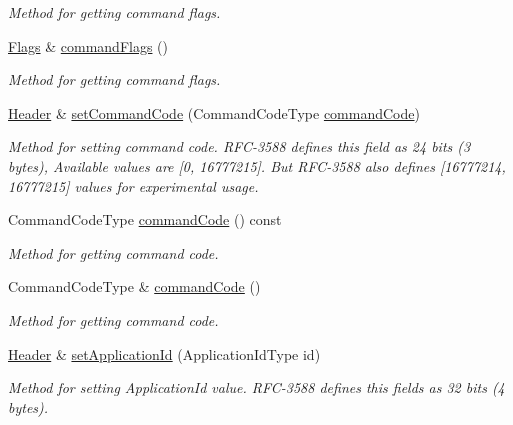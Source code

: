 \begin{DoxyCompactItemize}
\begin{DoxyCompactList}\small\item\em Method for getting command flags. \end{DoxyCompactList}\item 
\hyperlink{classDiameter_1_1Packet_1_1Header_1_1Flags}{Flags} \& \hyperlink{classDiameter_1_1Packet_1_1Header_a5994bb622b639d8c10816a6479e983f7}{command\+Flags} ()
\begin{DoxyCompactList}\small\item\em Method for getting command flags. \end{DoxyCompactList}\item 
\hyperlink{classDiameter_1_1Packet_1_1Header}{Header} \& \hyperlink{classDiameter_1_1Packet_1_1Header_a17299428edac5989e5cc0e6f3af733cc}{set\+Command\+Code} (Command\+Code\+Type \hyperlink{classDiameter_1_1Packet_1_1Header_a8e281f7c949efdb737d1b6d8e96a0a97}{command\+Code})
\begin{DoxyCompactList}\small\item\em Method for setting command code. R\+F\+C-\/3588 defines this field as 24 bits (3 bytes), Available values are \mbox{[}0, 16777215\mbox{]}. But R\+F\+C-\/3588 also defines \mbox{[}16777214, 16777215\mbox{]} values for experimental usage. \end{DoxyCompactList}\item 
Command\+Code\+Type \hyperlink{classDiameter_1_1Packet_1_1Header_a8e281f7c949efdb737d1b6d8e96a0a97}{command\+Code} () const
\begin{DoxyCompactList}\small\item\em Method for getting command code. \end{DoxyCompactList}\item 
Command\+Code\+Type \& \hyperlink{classDiameter_1_1Packet_1_1Header_a3ce08a9d9381e2e398a553b5a3442c36}{command\+Code} ()
\begin{DoxyCompactList}\small\item\em Method for getting command code. \end{DoxyCompactList}\item 
\hyperlink{classDiameter_1_1Packet_1_1Header}{Header} \& \hyperlink{classDiameter_1_1Packet_1_1Header_ac6c6637a00cf315e49495dd7d70e5a04}{set\+Application\+Id} (Application\+Id\+Type id)
\begin{DoxyCompactList}\small\item\em Method for setting Application\+Id value. R\+F\+C-\/3588 defines this fields as 32 bits (4 bytes). \end{DoxyCompactList}\item 

\end{DoxyCompactItemize}

